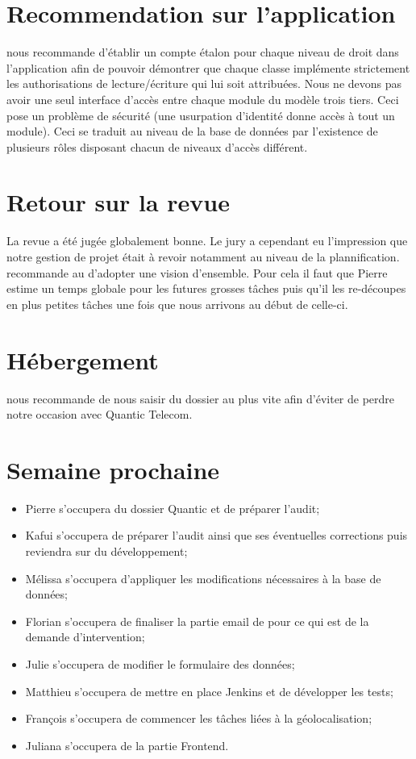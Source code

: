 \documentclass [a4paper] {article}
\begin{document}
\section{Recommendation sur l'application}
\nomTuteurPedago{} nous recommande d'établir un compte étalon pour chaque niveau de droit dans l'application afin de pouvoir démontrer que chaque classe implémente strictement les authorisations de lecture/écriture qui lui soit attribuées. 
Nous ne devons pas avoir une seul interface d'accès entre chaque module du modèle trois tiers. Ceci pose un problème de sécurité (une usurpation d'identité donne accès à tout un module).
Ceci se traduit au niveau de la base de données par l'existence de plusieurs rôles disposant chacun de niveaux d'accès différent.

\section{Retour sur la revue}
La revue a été jugée globalement bonne. Le jury a cependant eu l'impression que notre gestion de projet était à revoir notamment au niveau de la plannification.
\nomTuteurPedago{} recommande au \CP{} d'adopter une vision d'ensemble. Pour cela il faut que Pierre estime un temps globale pour les futures grosses tâches puis qu'il les re-découpes
en plus petites tâches une fois que nous arrivons au début de celle-ci.


\section{Hébergement}
\nomTuteurPedago{} nous recommande de nous saisir du dossier au plus vite afin d'éviter de perdre notre occasion avec Quantic Telecom.

\section{Semaine prochaine}
\begin{itemize}
\item Pierre s'occupera du dossier Quantic et de préparer l'audit;
\item Kafui s'occupera de préparer l'audit ainsi que ses éventuelles corrections puis reviendra sur du développement;
\item Mélissa s'occupera d'appliquer les modifications nécessaires à la base de données;
\item Florian s'occupera de finaliser la partie email de pour ce qui est de la demande d'intervention;
\item Julie s'occupera de modifier le formulaire des données;
\item Matthieu s'occupera de mettre en place Jenkins et de développer les tests;
\item François s'occupera de commencer les tâches liées à la géolocalisation;
\item Juliana s'occupera de la partie Frontend.
\end{itemize}
\newpage
\end{document}
